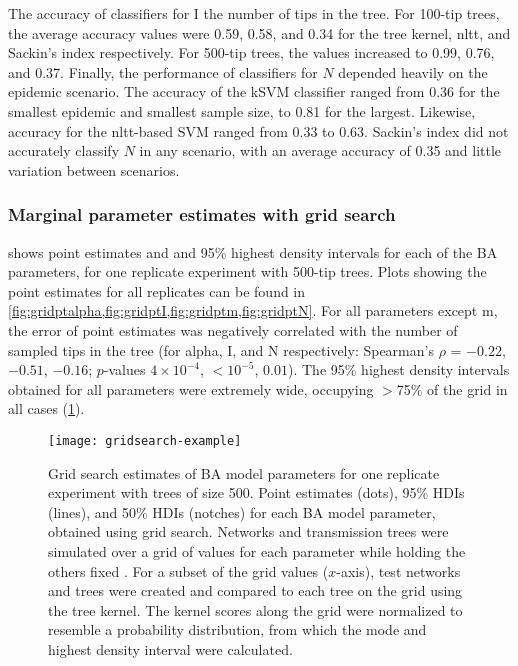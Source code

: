 The accuracy of classifiers for \gls{I}  the number of tips in the
tree. For 100-tip trees, the average accuracy values were
  0.59,
  0.58, and
  0.34
for the tree kernel, \gls{nltt}, and Sackin's index respectively. For 500-tip
trees, the values increased to
  0.99,
  0.76, and
  0.37.
Finally, the performance of classifiers for $N$ depended heavily on the
epidemic scenario. The accuracy of the \gls{kSVM} classifier ranged from
  0.36
for the smallest epidemic and smallest sample size, to
  0.81
for the largest. Likewise, accuracy for the \gls{nltt}-based SVM ranged from 
  0.33
to
  0.63.
Sackin's index did not accurately classify $N$ in any scenario, with an average
accuracy of
  0.35
and little variation between scenarios.

\subsubsection*{Marginal parameter estimates with grid search}



  shows point estimates and
 and 95\% highest density intervals for each of the \gls{BA}
parameters, for one replicate experiment with 500-tip trees. Plots showing the
point estimates for all replicates can be found in
\cref{fig:gridptalpha,fig:gridptI,fig:gridptm,fig:gridptN}. For all parameters
except \gls{m}, the error of point estimates was negatively correlated with the
number of sampled tips in the tree (for \gls{alpha}, \gls{I}, and \gls{N}
respectively: Spearman's $\rho$ = 
    \ensuremath{-0.22},
    \ensuremath{-0.51}, 
    \ensuremath{-0.16}; 
$p$-values
    $4\!\times\!10^{-4}$,
    ${<}10^{-5}$,
    $0.01$).
The 95\% highest density intervals obtained for all parameters were extremely
wide, occupying $>$75\% of the grid in all cases (\cref{fig:gridest}).

\begin{figure}[ht]
    \centering
    \texttt{[image: gridsearch-example]}
    \caption[
        Grid search estimates of \gls{BA} model parameters for one replicate
        experiment with trees of size 500.
    ]{
        Grid search estimates of \gls{BA} model parameters for one replicate
        experiment with trees of size 500. Point estimates (dots), 95\%
        \glspl{HDI} (lines), and 50\% \glspl{HDI} (notches) for each \gls{BA}
        model parameter, obtained using grid search. Networks and transmission
        trees were simulated over a grid of values for each parameter while
        holding the others fixed . For a subset of the
        grid values ($x$-axis), test networks and trees were created and
        compared to each tree on the grid using the tree kernel. The kernel
        scores along the grid were normalized to resemble a probability
        distribution, from which the mode and highest density interval were
        calculated.
    } 
    \label{fig:gridest}
\end{figure}

